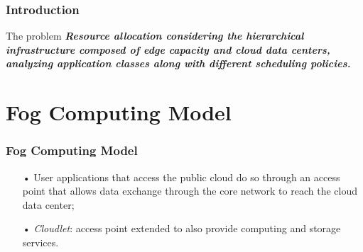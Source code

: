 \documentclass[10pt, pdf, xcolor=pdftex, dvipsnames, table]{beamer}
\begin{document}
\begin{frame}
	\frametitle{Introduction}
 	\begin{block}{The problem}
 			\textit{\newline \textbf{Resource allocation considering the hierarchical infrastructure composed of edge capacity and cloud data centers, analyzing application classes along with different scheduling policies.}\newline}
 	\end{block}
\end{frame}

\section[Fog Computing Model]{Fog Computing Model}

\begin{frame}
	\tableofcontents[currentsection]
\end{frame}

\begin{frame}
	\frametitle{Fog Computing Model}
 	\begin{block}{}
 		\begin{itemize}
 		    \item[•] User applications that access the public cloud do so through an access point that allows data exchange through the core network to reach the cloud data center;\newline
 		    \item[•] \emph{Cloudlet}: access point extended to also provide computing and storage services.
 		\end{itemize}
 	\end{block}
\end{frame}
\end{document}
